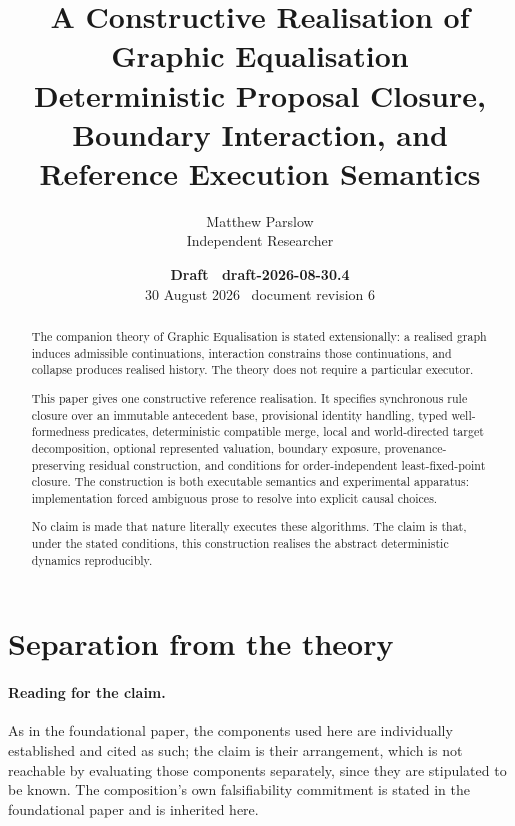 \documentclass[11pt,a4paper]{article}
\title{A Constructive Realisation of Graphic Equalisation\\
\large Deterministic Proposal Closure, Boundary Interaction, and Reference Execution Semantics}
\author{Matthew Parslow\\Independent Researcher}
\date{\textbf{Draft \textemdash\ draft-2026-08-30.4}\\[2pt]30 August 2026 \textbullet\ document revision 6}
\theoremstyle{remark}
\begin{document}
\maketitle
\begin{center}
\end{center}
\vspace{1em}


\begin{abstract}
The companion theory of Graphic Equalisation is stated extensionally: a realised graph induces admissible continuations, interaction constrains those continuations, and collapse produces realised history. The theory does not require a particular executor.

This paper gives one constructive reference realisation. It specifies synchronous rule closure over an immutable antecedent base, provisional identity handling, typed well-formedness predicates, deterministic compatible merge, local and world-directed target decomposition, optional represented valuation, boundary exposure, provenance-preserving residual construction, and conditions for order-independent least-fixed-point closure. The construction is both executable semantics and experimental apparatus: implementation forced ambiguous prose to resolve into explicit causal choices.

No claim is made that nature literally executes these algorithms. The claim is that, under the stated conditions, this construction realises the abstract deterministic dynamics reproducibly.
\end{abstract}

\section{Separation from the theory}\label{sec:separation}

\paragraph{Reading for the claim.}
As in the foundational paper, the components used here are individually established and cited as such; the claim is their arrangement, which is not reachable by evaluating those components separately, since they are stipulated to be known. The composition's own falsifiability commitment is stated in the foundational paper and is inherited here.
\end{document}
